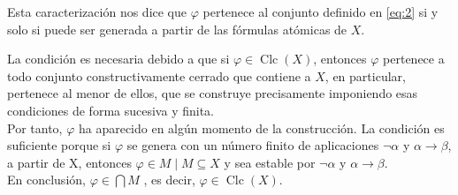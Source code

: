 \documentclass[12pt]{article}
\DeclareMathOperator{\Clc}{Clc}
\begin{document}
\begin{ejercicio}
Esta caracterización nos dice que $\varphi$ pertenece al conjunto definido en \eqref{eq:2} si y solo si puede ser generada a partir  de las fórmulas atómicas de $X$.

La condición es necesaria debido a que si $\varphi \in \Clc(X)$, entonces $\varphi$ pertenece a todo 
conjunto constructivamente cerrado que contiene a $X$, en particular, pertenece al menor de ellos,
que se construye precisamente imponiendo esas condiciones de forma sucesiva y finita. \\

Por tanto, $\varphi$ ha aparecido en algún momento de la construcción.
La condición es suficiente porque si $\varphi$ se genera con un número finito de aplicaciones
 $\lnot \alpha$ y $\alpha \rightarrow \beta$, a partir de X, entonces $\varphi \in M \mid M \subseteq X$
 y sea estable por $\lnot \alpha$ y $\alpha \rightarrow \beta$. \\ 

 En conclusión, $\varphi \in \bigcap M$ , es decir, $\varphi \in \Clc(X)$.



\end{ejercicio}
\end{document}
